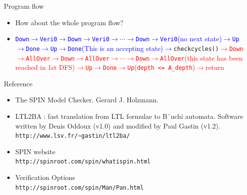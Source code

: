 \documentclass[12pt]{beamer}
\newcommand{\code}[1]{\texttt{#1}}
\begin{document}
\begin{frame}[fragile]{Program flow}
\begin{itemize}
	\item How about the whole program flow?
	\item 
	\textcolor{blue}{\code{Down}$\rightarrow$\code{Veri0}$\rightarrow$\code{Down}$\rightarrow$\code{Veri0}$\rightarrow\cdots\rightarrow$\code{Down}$\rightarrow$\code{Veri0}(no next state)$\rightarrow$\code{Up}$\rightarrow$\code{Done}$\rightarrow$\code{Up}$\rightarrow$\code{Done}(This is an accepting state)$\rightarrow$}\code{checkcycles()}\textcolor{red}{$\rightarrow$\code{Down}$\rightarrow$\code{AllOver}$\rightarrow$\code{Down}$\rightarrow$\code{AllOver}$\rightarrow\cdots\rightarrow$\code{Down}$\rightarrow$\code{AllOver}(this state has been reached in 1st DFS)$\rightarrow$\code{Up}$\rightarrow$\code{Done}$\rightarrow$\code{Up}(\code{depth <= A\_depth})$\rightarrow$return}
\end{itemize}
\end{frame}


\begin{frame}{Reference}
\begin{itemize}
	\item The SPIN Model Checker. Gerard J. Holzmann.
	\item LTL2BA : fast translation from LTL formulae to B¨uchi automata. Software written by Denis
Oddoux (v1.0) and modified by Paul Gastin (v1.2).\\
		\code{http://www.lsv.fr/∼gastin/ltl2ba/}
	\item SPIN website\\
		\code{http://spinroot.com/spin/whatispin.html
}
	\item Verification Options\\
		\code{http://spinroot.com/spin/Man/Pan.html
}
\end{itemize}
\end{frame}
\end{document}
